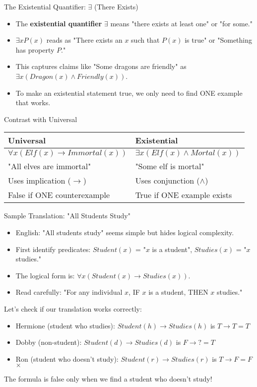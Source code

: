 \documentclass{beamer}
\begin{document}
	\begin{frame}{The Existential Quantifier: $\exists$ (There Exists)}
		\begin{itemize}
			\item The \textbf{existential quantifier} $\exists$ means "there exists at least one" or "for some."
			\item $\exists x P(x)$ reads as "There exists an $x$ such that $P(x)$ is true" or "Something has property $P$."
			\item This captures claims like "Some dragons are friendly" as $\exists x (Dragon(x) \wedge Friendly(x))$.
			\item To make an existential statement true, we only need to find ONE example that works.
		\end{itemize}
		
		\begin{block}{Contrast with Universal}
			\begin{tabular}{ll}
				\textbf{Universal} & \textbf{Existential} \\
				\hline
				$\forall x (Elf(x) \rightarrow Immortal(x))$ & $\exists x (Elf(x) \wedge Mortal(x))$ \\
				"All elves are immortal" & "Some elf is mortal" \\
				Uses implication ($\rightarrow$) & Uses conjunction ($\wedge$) \\
				False if ONE counterexample & True if ONE example exists
			\end{tabular}
		\end{block}
	\end{frame}
	
	\begin{frame}{Sample Translation: "All Students Study"}
		\begin{itemize}
			\item English: "All students study" seems simple but hides logical complexity.
			\item First identify predicates: $Student(x)$ = "$x$ is a student", $Studies(x)$ = "$x$ studies."
			\item The logical form is: $\forall x (Student(x) \rightarrow Studies(x))$.
			\item Read carefully: "For any individual $x$, IF $x$ is a student, THEN $x$ studies."
		\end{itemize}
		
		\begin{example}
			Let's check if our translation works correctly:
			\begin{itemize}
				\item Hermione (student who studies): $Student(h) \rightarrow Studies(h)$ is $T \rightarrow T = T$ \checkmark
				\item Dobby (non-student): $Student(d) \rightarrow Studies(d)$ is $F \rightarrow ? = T$ \checkmark
				\item Ron (student who doesn't study): $Student(r) \rightarrow Studies(r)$ is $T \rightarrow F = F$ $\times$
			\end{itemize}
			The formula is false only when we find a student who doesn't study!
		\end{example}
	\end{frame}
	
\end{document}
